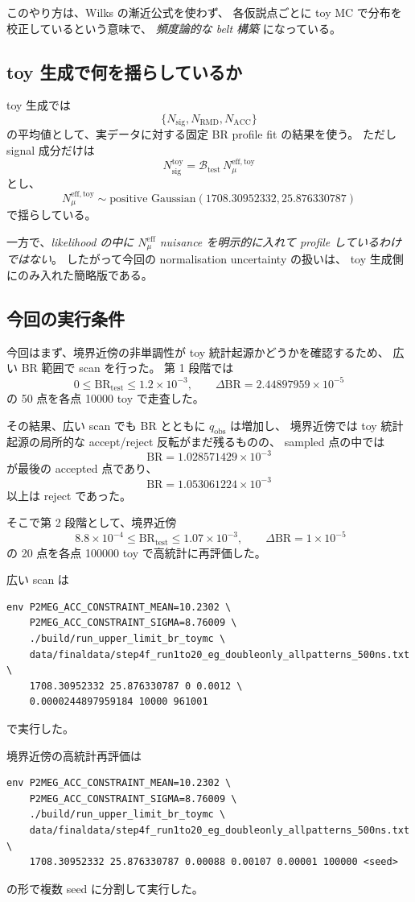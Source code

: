 \documentclass[a4paper,11pt]{jsarticle}
\begin{document}
このやり方は、Wilks の漸近公式を使わず、
各仮説点ごとに toy MC で分布を校正しているという意味で、
\emph{頻度論的な belt 構築} になっている。

\subsection{toy 生成で何を揺らしているか}
toy 生成では
\[
\{N_{\mathrm{sig}},N_{\mathrm{RMD}},N_{\mathrm{ACC}}\}
\]
の平均値として、実データに対する固定 BR profile fit の結果を使う。
ただし signal 成分だけは
\[
N_{\mathrm{sig}}^{\mathrm{toy}} = \mathcal{B}_{\mathrm{test}}\,N_{\mu}^{\mathrm{eff,toy}}
\]
とし、
\[
N_{\mu}^{\mathrm{eff,toy}}\sim \text{positive Gaussian}(1708.30952332,25.876330787)
\]
で揺らしている。

一方で、\emph{likelihood の中に \(N_{\mu}^{\mathrm{eff}}\) nuisance を明示的に入れて profile しているわけではない}。
したがって今回の normalisation uncertainty の扱いは、
toy 生成側にのみ入れた簡略版である。

\subsection{今回の実行条件}
今回はまず、境界近傍の非単調性が toy 統計起源かどうかを確認するため、
広い BR 範囲で scan を行った。
第 1 段階では
\[
0 \le \mathrm{BR}_{\mathrm{test}} \le 1.2\times 10^{-3},
\qquad
\Delta \mathrm{BR}=2.44897959\times 10^{-5}
\]
の 50 点を各点 10000 toy で走査した。

その結果、広い scan でも BR とともに \(q_{\mathrm{obs}}\) は増加し、
境界近傍では toy 統計起源の局所的な accept/reject 反転がまだ残るものの、
sampled 点の中では
\[
\mathrm{BR}=1.028571429\times10^{-3}
\]
が最後の accepted 点であり、
\[
\mathrm{BR}=1.053061224\times10^{-3}
\]
以上は reject であった。

そこで第 2 段階として、境界近傍
\[
\;8.8\times 10^{-4}\le \mathrm{BR}_{\mathrm{test}} \le 1.07\times 10^{-3},
\qquad
\Delta \mathrm{BR}=1\times 10^{-5}
\]
の 20 点を各点 100000 toy で高統計に再評価した。

広い scan は
\begin{verbatim}
env P2MEG_ACC_CONSTRAINT_MEAN=10.2302 \
    P2MEG_ACC_CONSTRAINT_SIGMA=8.76009 \
    ./build/run_upper_limit_br_toymc \
    data/finaldata/step4f_run1to20_eg_doubleonly_allpatterns_500ns.txt \
    1708.30952332 25.876330787 0 0.0012 \
    0.0000244897959184 10000 961001
\end{verbatim}
で実行した。

境界近傍の高統計再評価は
\begin{verbatim}
env P2MEG_ACC_CONSTRAINT_MEAN=10.2302 \
    P2MEG_ACC_CONSTRAINT_SIGMA=8.76009 \
    ./build/run_upper_limit_br_toymc \
    data/finaldata/step4f_run1to20_eg_doubleonly_allpatterns_500ns.txt \
    1708.30952332 25.876330787 0.00088 0.00107 0.00001 100000 <seed>
\end{verbatim}
の形で複数 seed に分割して実行した。
\end{document}
